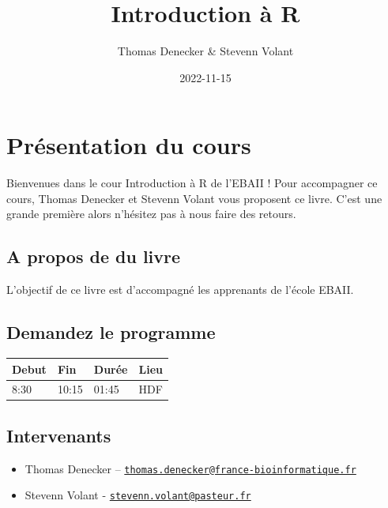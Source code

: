 \documentclass[
]{book}
\title{Introduction à R}
\author{Thomas Denecker \& Stevenn Volant}
\date{2022-11-15}
\providecommand{\tightlist}{%
  \setlength{\itemsep}{0pt}\setlength{\parskip}{0pt}}
\begin{document}
\maketitle

{
\setcounter{tocdepth}{1}
\tableofcontents
}
\hypertarget{pruxe9sentation-du-cours}{%
\chapter{Présentation du cours}\label{pruxe9sentation-du-cours}}

Bienvenues dans le cour Introduction à R de l'EBAII ! Pour accompagner ce cours, Thomas Denecker et Stevenn Volant vous proposent ce livre. C'est une grande première alors n'hésitez pas à nous faire des retours.

\hypertarget{a-propos-de-du-livre}{%
\section{A propos de du livre}\label{a-propos-de-du-livre}}

L'objectif de ce livre est d'accompagné les apprenants de l'école EBAII.

\hypertarget{demandez-le-programme}{%
\section{Demandez le programme}\label{demandez-le-programme}}

\begin{longtable}[]{@{}llll@{}}
\toprule()
Debut & Fin & Durée & Lieu \\
\midrule()
\endhead
8:30 & 10:15 & 01:45 & HDF \\
\bottomrule()
\end{longtable}

\hypertarget{intervenants}{%
\section{Intervenants}\label{intervenants}}

\begin{itemize}
\tightlist
\item
  Thomas Denecker -- \href{mailto:thomas.denecker@france-bioinformatique.fr}{\nolinkurl{thomas.denecker@france-bioinformatique.fr}}
\item
  Stevenn Volant - \href{mailto:stevenn.volant@pasteur.fr}{\nolinkurl{stevenn.volant@pasteur.fr}}
\end{itemize}
\end{document}
